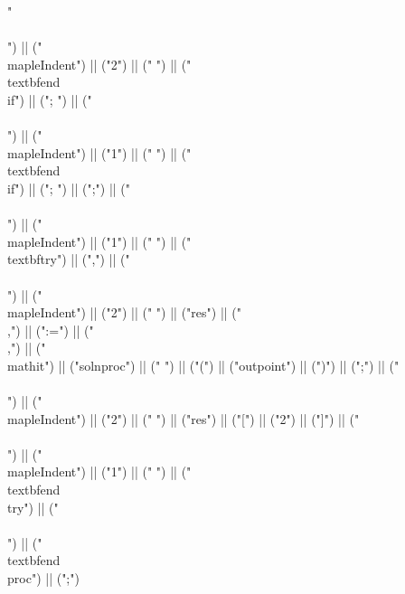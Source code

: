 \documentclass{article}
\begin{document}
\begin{center}
\begin{maplelatex}
{"\\\\\n") || ("\\mapleIndent{") || ("2") || ("} ") || ("\\textbf{end\\ if}") || ("; ") || ("\\\\\n") || ("\\mapleIndent{") || ("1") || ("} ") || ("\\textbf{end\\ if}") || ("; ") || (";") || ("\\\\\n") || ("\\mapleIndent{") || ("1") || ("} ") || ("\\textbf{try}") || (",") || ("\\\\\n") || ("\\mapleIndent{") || ("2") || ("} ") || ("res") || ("\\,") || (":=") || ("\\,") || ("\\mathit{") || ("solnproc") || ("} ") || ("(") || ("outpoint") || (")") || (";") || ("\\\\\n") || ("\\mapleIndent{") || ("2") || ("} ") || ("res") || ("[") || ("2") || ("]") || ("\\\\\n") || ("\\mapleIndent{") || ("1") || ("} ") || ("\\textbf{end\\ try}") || ("\\\\\n") || ("\\textbf{end\\ proc}") || (";")}
\end{maplelatex}
\end{center}
\end{document}
